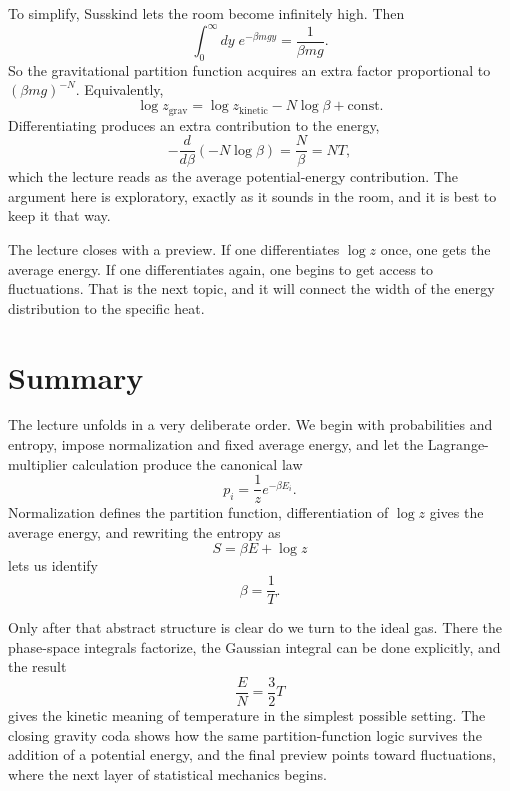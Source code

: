 To simplify, Susskind lets the room become infinitely high. Then
\begin{equation}
\int_0^\infty dy\;e^{-\beta mgy}=\frac{1}{\beta m g}.
\end{equation}
So the gravitational partition function acquires an extra factor proportional to \((\beta m g)^{-N}\). Equivalently,
\begin{equation}
\log z_{\mathrm{grav}}
=
\log z_{\mathrm{kinetic}}-N\log\beta+\mathrm{const}.
\end{equation}
Differentiating produces an extra contribution to the energy,
\begin{equation}
-\frac{d}{d\beta}(-N\log\beta)=\frac{N}{\beta}=NT,
\end{equation}
which the lecture reads as the average potential-energy contribution. The argument here is exploratory, exactly as it sounds in the room, and it is best to keep it that way.

The lecture closes with a preview. If one differentiates \(\log z\) once, one gets the average energy. If one differentiates again, one begins to get access to fluctuations. That is the next topic, and it will connect the width of the energy distribution to the specific heat.

\section{Summary}

The lecture unfolds in a very deliberate order. We begin with probabilities and entropy, impose normalization and fixed average energy, and let the Lagrange-multiplier calculation produce the canonical law
\begin{equation}
p_i=\frac{1}{z}e^{-\beta E_i}.
\end{equation}
Normalization defines the partition function, differentiation of \(\log z\) gives the average energy, and rewriting the entropy as
\begin{equation}
S=\beta E+\log z
\end{equation}
lets us identify
\begin{equation}
\beta=\frac{1}{T}.
\end{equation}

Only after that abstract structure is clear do we turn to the ideal gas. There the phase-space integrals factorize, the Gaussian integral can be done explicitly, and the result
\begin{equation}
\frac{E}{N}=\frac{3}{2}T
\end{equation}
gives the kinetic meaning of temperature in the simplest possible setting. The closing gravity coda shows how the same partition-function logic survives the addition of a potential energy, and the final preview points toward fluctuations, where the next layer of statistical mechanics begins.